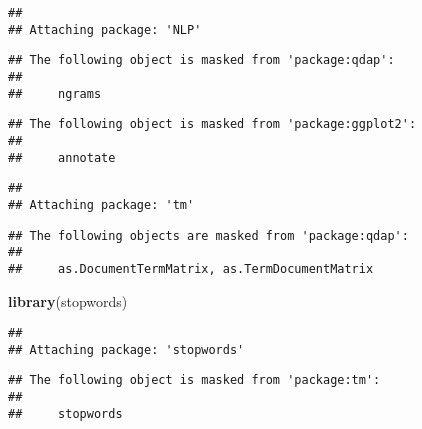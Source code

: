 \documentclass[]{article}
\newenvironment{Shaded}{\begin{snugshade}}{\end{snugshade}}
\newcommand{\KeywordTok}[1]{\textcolor[rgb]{0.13,0.29,0.53}{\textbf{#1}}}
\newcommand{\DataTypeTok}[1]{\textcolor[rgb]{0.13,0.29,0.53}{#1}}
\newcommand{\StringTok}[1]{\textcolor[rgb]{0.31,0.60,0.02}{#1}}
\newcommand{\CommentTok}[1]{\textcolor[rgb]{0.56,0.35,0.01}{\textit{#1}}}
\newcommand{\OperatorTok}[1]{\textcolor[rgb]{0.81,0.36,0.00}{\textbf{#1}}}
\newcommand{\NormalTok}[1]{#1}
\begin{document}
\begin{verbatim}
## 
## Attaching package: 'NLP'
\end{verbatim}

\begin{verbatim}
## The following object is masked from 'package:qdap':
## 
##     ngrams
\end{verbatim}

\begin{verbatim}
## The following object is masked from 'package:ggplot2':
## 
##     annotate
\end{verbatim}

\begin{verbatim}
## 
## Attaching package: 'tm'
\end{verbatim}

\begin{verbatim}
## The following objects are masked from 'package:qdap':
## 
##     as.DocumentTermMatrix, as.TermDocumentMatrix
\end{verbatim}

\begin{Shaded}
\begin{Highlighting}[]
\KeywordTok{library}\NormalTok{(stopwords)}
\end{Highlighting}
\end{Shaded}

\begin{verbatim}
## 
## Attaching package: 'stopwords'
\end{verbatim}

\begin{verbatim}
## The following object is masked from 'package:tm':
## 
##     stopwords
\end{verbatim}

\begin{Shaded}
\end{Shaded}
\end{document}

